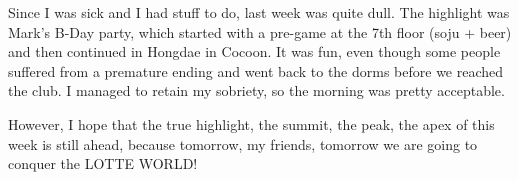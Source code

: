 \begin{post}
\begin{content}
Since I was sick and I had stuff to do, last week was quite dull. The highlight was Mark's B-Day party, which started with a pre-game at the 7th floor (soju + beer) and then continued in Hongdae in Cocoon. It was fun, even though some people suffered from a premature ending and went back to the dorms before we reached the club. I managed to retain my sobriety, so the morning was pretty acceptable.
	
However, I hope that the true highlight, the summit, the peak, the apex of this week is still ahead, because tomorrow, my friends, tomorrow we are going to conquer the LOTTE WORLD!
	\end{content}
\end{post}
